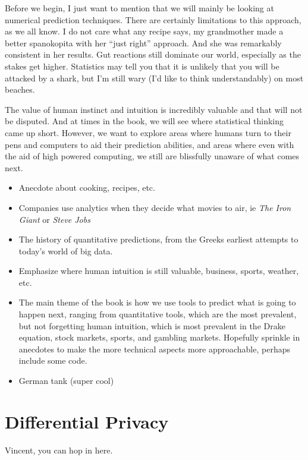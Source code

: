 \documentclass[12pt,twoside]{book}
\begin{document}
 Before we begin, I just want to mention that we will mainly be looking at numerical prediction techniques.  There are certainly limitations to this approach, as we all know.  I do not care what any recipe says, my grandmother made a better spanokopita with her ``just right'' approach.  And she was remarkably consistent in her results.  Gut reactions still dominate our world, especially as the stakes get higher.  Statistics may tell you that it is unlikely that you will be attacked by a shark, but I'm still wary (I'd like to think understandably) on most beaches.  
 
 The value of human instinct and intuition is incredibly valuable and that will not be disputed. And at times in the book, we will see where statistical thinking came up short.   However, we want to explore areas where humans turn to their pens and computers to aid their prediction abilities, and areas where even with the aid of high powered computing, we still are blissfully unaware of what comes next.

	\begin{itemize}
		\item Anecdote about cooking, recipes, etc.
		\item Companies use analytics when they decide what movies to air, ie \emph{The Iron Giant} or \emph{Steve Jobs}
		\item The history of quantitative predictions, from the Greeks earliest attempts to today's world of big data.
		\item Emphasize where human intuition is still valuable, business, sports, weather, etc. 
		\item The main theme of the book is how we use tools to predict what is going to happen next, ranging from quantitative tools, which are the most prevalent, but not forgetting human intuition, which is most prevalent in the Drake equation, stock markets, sports, and gambling markets. Hopefully sprinkle in anecdotes to make the more technical aspects more approachable, perhaps include some code.
		\item German tank (super cool)
	\end{itemize}
	\chapter{Differential Privacy}
		\begin{savequote}[45mm]
		Vincent, you can hop in here.
	\end{savequote}
\end{document}
